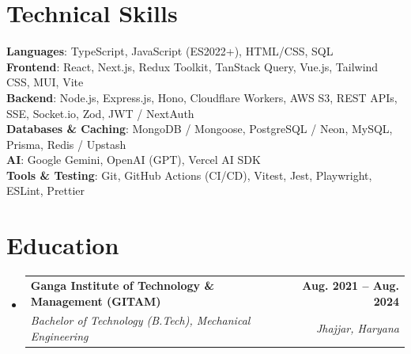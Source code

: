 \documentclass[letterpaper,11pt]{article}
\makeatletter
\newcommand{\resumeSubheading}[4]{
  \vspace{-2pt}\item
    \begin{tabular*}{1.0\textwidth}[t]{l@{\extracolsep{\fill}}r}
      \textbf{#1} & \textbf{\small #2} \\
      \textit{\small#3} & \textit{\small #4} \\
    \end{tabular*}\vspace{-7pt}
}
\newcommand{\resumeSubHeadingListStart}{\begin{itemize}[leftmargin=0.0in, label={}]}
\newcommand{\resumeSubHeadingListEnd}{\end{itemize}}
\makeatother
\begin{document}
\section{Technical Skills}
 \begin{itemize}[leftmargin=0.15in, label={}]
    \small{\item{
     \textbf{Languages}{: TypeScript, JavaScript (ES2022+), HTML/CSS, SQL} \\
     \textbf{Frontend}{: React, Next.js, Redux Toolkit, TanStack Query, Vue.js, Tailwind CSS, MUI, Vite} \\
     \textbf{Backend}{: Node.js, Express.js, Hono, Cloudflare Workers, AWS S3, REST APIs, SSE, Socket.io, Zod, JWT / NextAuth} \\
     \textbf{Databases \& Caching}{: MongoDB / Mongoose, PostgreSQL / Neon, MySQL, Prisma, Redis / Upstash} \\
     \textbf{AI}{: Google Gemini, OpenAI (GPT), Vercel AI SDK} \\
     \textbf{Tools \& Testing}{: Git, GitHub Actions (CI/CD), Vitest, Jest, Playwright, ESLint, Prettier} \\
    }}
 \end{itemize}
\vspace{-9pt}

\section{Education}
  \resumeSubHeadingListStart
    \resumeSubheading
      {Ganga Institute of Technology \& Management (GITAM)}{Aug. 2021 -- Aug. 2024}
      {Bachelor of Technology (B.Tech), Mechanical Engineering}{Jhajjar, Haryana}
  \resumeSubHeadingListEnd
\end{document}
